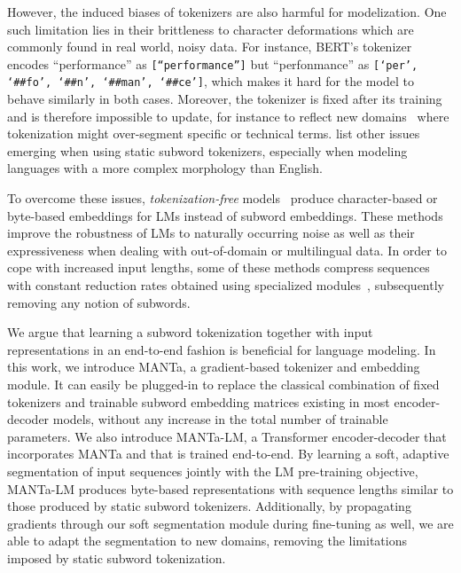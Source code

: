 However, the induced biases of tokenizers are also harmful for modelization. One such limitation lies in their brittleness to character deformations which are commonly found in real world, noisy data. For instance, BERT's tokenizer~\cite{devlin-etal-2019-bert} encodes ``performance'' as \texttt{[``performance'']} but \mbox{``perfonmance''} as \texttt{[`per', `\#\#fo', `\#\#n', `\#\#man', `\#\#ce']}, which makes it hard for the model to behave similarly in both cases. Moreover, the tokenizer is fixed after its training and is therefore impossible to update, for instance to reflect new domains~\cite{el-boukkouri-etal-2020-characterbert} where tokenization might over-segment specific or technical terms. \citet{clark2022canine} list other issues emerging when using static subword tokenizers, especially when modeling languages with a more complex morphology than English.

To overcome these issues, \textit{tokenization-free} models~\cite{clark2022canine,xue2022byt5,tay2021charformer} produce character-based or byte-based embeddings for LMs instead of subword embeddings. These methods improve the robustness of LMs to naturally occurring noise as well as their expressiveness when dealing with out-of-domain or multilingual data. In order to cope with increased input lengths, some of these methods compress sequences with constant reduction rates obtained using specialized modules~\cite{clark2022canine,tay2021charformer}, subsequently removing any notion of subwords.

We argue that learning a subword tokenization together with input representations in an end-to-end fashion is beneficial for language modeling. In this work, we introduce MANTa, a gradient-based tokenizer and embedding module. It can easily be plugged-in to replace the classical combination of fixed tokenizers and trainable subword embedding matrices existing in most encoder-decoder models, without any increase in the total number of trainable parameters. We also introduce MANTa-LM, a Transformer encoder-decoder that incorporates MANTa and that is trained end-to-end. By learning a soft, adaptive segmentation of input sequences jointly with the LM pre-training objective, MANTa-LM produces byte-based representations with sequence lengths similar to those produced by static subword tokenizers. Additionally, by propagating gradients through our soft segmentation module during fine-tuning as well, we are able to adapt the segmentation to new domains, removing the limitations imposed by static subword tokenization.

